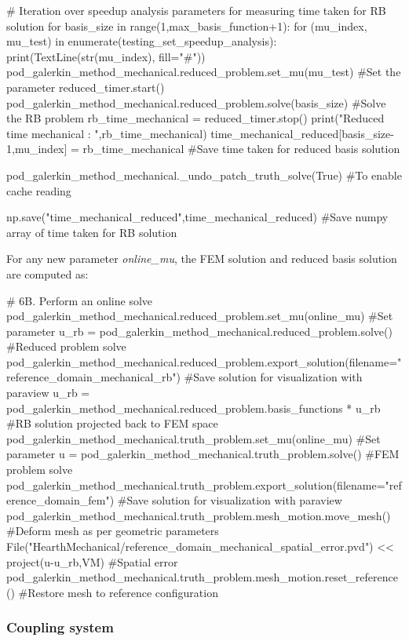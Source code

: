 \begin{python}
# Iteration over speedup analysis parameters for measuring time taken for RB solution
for basis_size in range(1,max_basis_function+1):
	for (mu_index, mu_test) in enumerate(testing_set_speedup_analysis):
		print(TextLine(str(mu_index), fill="#"))
		pod_galerkin_method_mechanical.reduced_problem.set_mu(mu_test) #Set the parameter
		reduced_timer.start()
		pod_galerkin_method_mechanical.reduced_problem.solve(basis_size) #Solve the RB problem
		rb_time_mechanical = reduced_timer.stop()
		print("Reduced time mechanical : ",rb_time_mechanical)
		time_mechanical_reduced[basis_size-1,mu_index] = rb_time_mechanical #Save time taken for reduced basis solution

pod_galerkin_method_mechanical._undo_patch_truth_solve(True) #To enable cache reading

np.save("time_mechanical_reduced",time_mechanical_reduced) #Save numpy array of time taken for RB solution
\end{python}

For any new parameter \emph{online\_mu}, the FEM solution and reduced basis solution are computed as:
\begin{python}
# 6B. Perform an online solve
pod_galerkin_method_mechanical.reduced_problem.set_mu(online_mu) #Set parameter
u_rb = pod_galerkin_method_mechanical.reduced_problem.solve() #Reduced problem solve
pod_galerkin_method_mechanical.reduced_problem.export_solution(filename="reference_domain_mechanical_rb") #Save solution for visualization with paraview
u_rb = pod_galerkin_method_mechanical.reduced_problem.basis_functions * u_rb #RB solution projected back to FEM space
pod_galerkin_method_mechanical.truth_problem.set_mu(online_mu) #Set parameter
u = pod_galerkin_method_mechanical.truth_problem.solve() #FEM problem solve
pod_galerkin_method_mechanical.truth_problem.export_solution(filename="reference_domain_fem") #Save solution for visualization with paraview
pod_galerkin_method_mechanical.truth_problem.mesh_motion.move_mesh() #Deform mesh as per geometric parameters
File("HearthMechanical/reference_domain_mechanical_spatial_error.pvd") << project(u-u_rb,VM) #Spatial error
pod_galerkin_method_mechanical.truth_problem.mesh_motion.reset_reference() #Restore mesh to reference configuration
\end{python}

\subsubsection{Coupling system}

